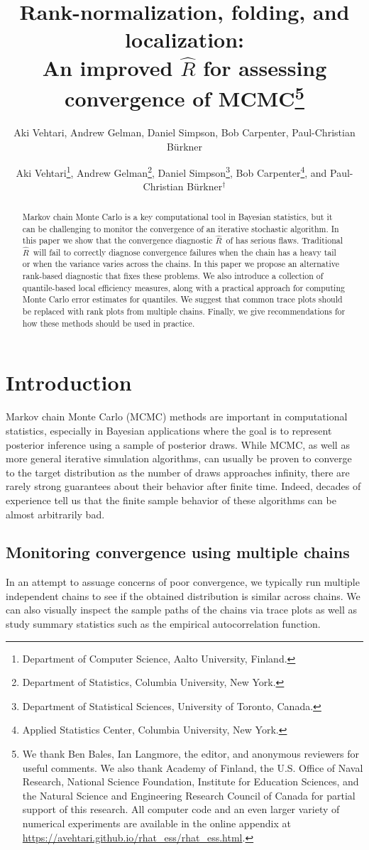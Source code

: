 \documentclass[american,]{article}
\title{Rank-normalization, folding, and localization:\\
  An improved $\widehat{R}$ for assessing convergence of MCMC\footnote{We thank Ben Bales, Ian Langmore, the editor, and anonymous reviewers for useful comments. We also thank Academy of Finland, the U.S. Office of Naval Research, National Science Foundation, Institute for Education Sciences, and the Natural Science and Engineering Research Council of Canada for partial support of this research.  All computer code and an 
even larger variety of numerical experiments are available in the online 
appendix at \url{https://avehtari.github.io/rhat_ess/rhat_ess.html}.}\vspace{.1in}}
\author{Aki Vehtari, Andrew Gelman, Daniel Simpson, Bob Carpenter, Paul-Christian Bürkner}
\author{
Aki Vehtari\footnote{Department of Computer Science, Aalto University, Finland.},
   Andrew Gelman\footnote{Department of Statistics, Columbia University, New York.},
 Daniel Simpson\footnote{Department of Statistical Sciences, University of Toronto, Canada.},
 Bob Carpenter\footnote{Applied Statistics Center, Columbia
   University, New York.},
and Paul-Christian B\"{u}rkner$^\dagger$
}
\date{}
\newcommand{\Rhat}{$\widehat{R}$}
\theoremstyle{definition}
\begin{document}
\maketitle
\begin{abstract}
  Markov chain Monte Carlo is a key computational tool in Bayesian 
  statistics, but it can be challenging to monitor the convergence of an iterative stochastic algorithm.
In this paper we show that the convergence diagnostic \Rhat\ 
of \citet{Gelman+Rubin:1992} has serious flaws. Traditional \Rhat\ will fail to correctly diagnose
convergence failures when the chain has a heavy tail or when the variance varies across 
the chains. In this paper we propose an alternative rank-based diagnostic that fixes these 
problems. We also introduce
  a collection of quantile-based local efficiency
  measures, along with a practical approach for computing Monte Carlo error
  estimates for quantiles. We suggest that common trace plots should
  be replaced with rank plots from multiple chains. Finally, we give
  recommendations for how these methods should be used
  in practice.
\end{abstract}

\hypertarget{introduction}{%
\section{Introduction}\label{introduction}}

Markov chain Monte Carlo (MCMC) methods are important in computational statistics, especially 
in Bayesian applications where the goal is to represent
posterior inference using a sample of posterior draws. While MCMC, 
as well as more general iterative
simulation algorithms, can usually be proven to converge
to the target distribution as the number of draws approaches infinity,
there are rarely strong guarantees about their behavior after finite time. Indeed, decades of experience tell us that
the finite sample behavior of these algorithms can be almost arbitrarily bad.


\subsection{Monitoring convergence using multiple chains}


In an attempt to assuage concerns of poor convergence, we typically run multiple 
independent chains  to see if the obtained 
distribution is similar across chains.  We can also visually inspect
the sample paths of the chains via trace plots as well as study summary 
statistics such as the empirical autocorrelation function. 
\end{document}

